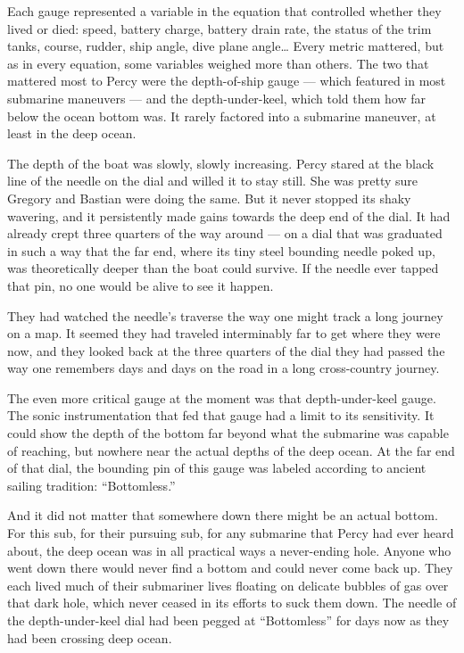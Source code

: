 \documentclass[
]{scrbook}
\begin{document}
Each gauge represented a variable in the equation that controlled
whether they lived or died: speed, battery charge, battery drain rate,
the status of the trim tanks, course, rudder, ship angle, dive plane
angle\ldots{} Every metric mattered, but as in every equation, some
variables weighed more than others. The two that mattered most to Percy
were the depth-of-ship gauge --- which featured in most submarine
maneuvers --- and the depth-under-keel, which told them how far below
the ocean bottom was. It rarely factored into a submarine maneuver, at
least in the deep ocean.

The depth of the boat was slowly, slowly increasing. Percy stared at the
black line of the needle on the dial and willed it to stay still. She
was pretty sure Gregory and Bastian were doing the same. But it never
stopped its shaky wavering, and it persistently made gains towards the
deep end of the dial. It had already crept three quarters of the way
around --- on a dial that was graduated in such a way that the far end,
where its tiny steel bounding needle poked up, was theoretically deeper
than the boat could survive. If the needle ever tapped that pin, no one
would be alive to see it happen.

They had watched the needle's traverse the way one might track a long
journey on a map. It seemed they had traveled interminably far to get
where they were now, and they looked back at the three quarters of the
dial they had passed the way one remembers days and days on the road in
a long cross-country journey.

The even more critical gauge at the moment was that depth-under-keel
gauge. The sonic instrumentation that fed that gauge had a limit to its
sensitivity. It could show the depth of the bottom far beyond what the
submarine was capable of reaching, but nowhere near the actual depths of
the deep ocean. At the far end of that dial, the bounding pin of this
gauge was labeled according to ancient sailing tradition:
``Bottomless.''

And it did not matter that somewhere down there might be an actual
bottom. For this sub, for their pursuing sub, for any submarine that
Percy had ever heard about, the deep ocean was in all practical ways a
never-ending hole. Anyone who went down there would never find a bottom
and could never come back up. They each lived much of their submariner
lives floating on delicate bubbles of gas over that dark hole, which
never ceased in its efforts to suck them down. The needle of the
depth-under-keel dial had been pegged at ``Bottomless'' for days now as
they had been crossing deep ocean.
\end{document}
